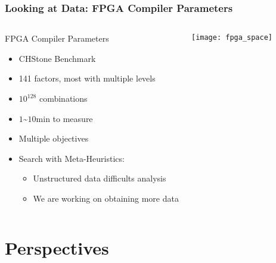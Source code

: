 \documentclass[10pt, compress, aspectratio=169, xcolor={table,usenames,dvipsnames}]{beamer}
\begin{document}
\begin{frame}
    \frametitle{Looking at Data: FPGA Compiler Parameters}
    \begin{columns}[c]
            \begin{block}{FPGA Compiler Parameters}
                \begin{itemize}
                    \item \alert{CHStone Benchmark}
                    \item \alert{141} factors, \alert{most with multiple
                        levels}
                    \item \alert{$10^{128}$} combinations
                    \item \alert{$1$\textasciitilde$10$min} to measure
                    \item \alert{Multiple objectives}
                    \item \alert{Search with Meta-Heuristics}:
                        \begin{itemize}
                            \item \alert{Unstructured data difficults analysis}
                            \item We are working on \alert{obtaining more data}
                        \end{itemize}
                \end{itemize}
            \end{block}

            \begin{block}{}
                \vspace{-.4cm}
                \texttt{[image: fpga\_space]}
            \end{block}

    \end{columns}
\end{frame}

\section{Perspectives}
\end{document}

